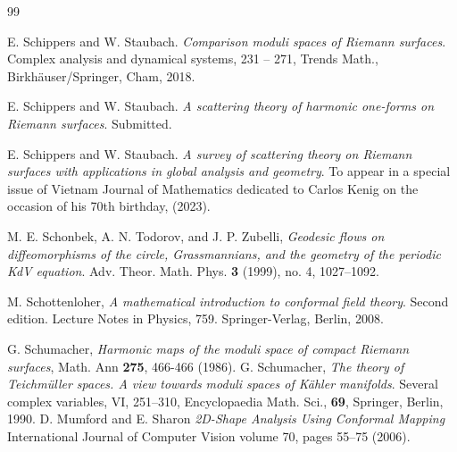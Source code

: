 \documentclass[12pt]{amsart}
\theoremstyle{plain}
\theoremstyle{definition}
\theoremstyle{remark}
\numberwithin{equation}{section} %
\numberwithin{figure}{section} %
\begin{document}
\begin{thebibliography}{99}



 
   E. Schippers and W. Staubach.  {\it  Comparison moduli spaces of Riemann surfaces}. Complex analysis and dynamical systems, 231 -- 271, Trends Math., Birkh\"auser/Springer, Cham, 2018.

  E. Schippers and  W. Staubach. {\it A scattering theory of harmonic one-forms on Riemann surfaces}. Submitted. 
 
  E. Schippers and  W. Staubach. {\it A survey of scattering theory on Riemann surfaces with applications in global analysis and geometry}. To appear in a special issue of Vietnam Journal of Mathematics dedicated to Carlos Kenig on the occasion of his 70th birthday, (2023). 
 

  M. E. Schonbek, A. N. Todorov, and J. P. Zubelli,
 \textit{Geodesic flows on diffeomorphisms of the circle, Grassmannians, and the geometry of the periodic \emph{KdV} equation}. 
Adv. Theor. Math. Phys. {\bf 3} (1999), no. 4, 1027--1092.

 M. Schottenloher,  {\it A mathematical introduction to conformal field theory}. Second edition. Lecture Notes in Physics, 759. Springer-Verlag, Berlin, 2008.

 G. Schumacher, {\it Harmonic maps of the moduli space of compact Riemann
surfaces}, Math. Ann {\bf 275}, 466-466 (1986).
 G. Schumacher, {\it The theory of Teichmüller spaces. A view towards moduli spaces of Kähler manifolds}. Several complex variables, VI, 251–310, Encyclopaedia Math. Sci., {\bf 69}, Springer, Berlin, 1990. 
D. Mumford and E. Sharon \textit{2D-Shape Analysis Using Conformal Mapping}
International Journal of Computer Vision volume 70, pages 55–75 (2006).


\end{thebibliography}
\end{document}
